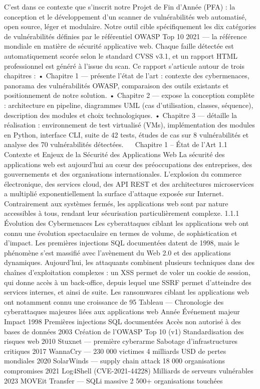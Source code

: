 C'est dans ce contexte que s'inscrit notre Projet de Fin d'Année (PFA) : la conception et le développement d'un scanner de vulnérabilités web automatisé, open source, léger et modulaire. Notre outil cible spécifiquement les dix catégories de vulnérabilités définies par le référentiel OWASP Top 10 2021 — la référence mondiale en matière de sécurité applicative web. Chaque faille détectée est automatiquement scorée selon le standard CVSS v3.1, et un rapport HTML professionnel est généré à l'issue du scan.
Ce rapport s'articule autour de trois chapitres :
•	Chapitre 1 — présente l'état de l'art : contexte des cybermenaces, panorama des vulnérabilités OWASP, comparaison des outils existants et positionnement de notre solution.
•	Chapitre 2 — expose la conception complète : architecture en pipeline, diagrammes UML (cas d'utilisation, classes, séquence), description des modules et choix technologiques.
•	Chapitre 3 — détaille la réalisation : environnement de test virtualisé (VMs), implémentation des modules en Python, interface CLI, suite de 42 tests, études de cas sur 8 vulnérabilités et analyse des 70 vulnérabilités détectées.
 
Chapitre 1 – État de l'Art
1.1  Contexte et Enjeux de la Sécurité des Applications Web
La sécurité des applications web est aujourd'hui au cœur des préoccupations des entreprises, des gouvernements et des organisations internationales. L'explosion du commerce électronique, des services cloud, des API REST et des architectures microservices a multiplié exponentiellement la surface d'attaque exposée sur Internet. Contrairement aux systèmes fermés, les applications web sont par nature accessibles à tous, rendant leur sécurisation particulièrement complexe.
1.1.1  Évolution des Cybermenaces
Les cyberattaques ciblant les applications web ont connu une évolution spectaculaire en termes de volume, de sophistication et d'impact. Les premières injections SQL documentées datent de 1998, mais le phénomène s'est massifié avec l'avènement du Web 2.0 et des applications dynamiques. Aujourd'hui, les attaquants combinent plusieurs techniques dans des chaînes d'exploitation complexes : un XSS permet de voler un cookie de session, qui donne accès à un back-office, depuis lequel une SSRF permet d'atteindre des services internes, et ainsi de suite.
Les ransomwares ciblant les applications web ont notamment connu une croissance de 95 %
Tableau — Chronologie des cyberattaques majeures liées aux applications web
Année	Événement majeur	Impact
1998	Premières injections SQL documentées	Accès non autorisé à des bases de données
2003	Création de l'OWASP Top 10 (v1)	Standardisation des risques web
2010	Stuxnet — première cyberarme	Sabotage d'infrastructures critiques
2017	WannaCry — 230 000 victimes	4 milliards USD de pertes mondiales
2020	SolarWinds — supply chain attack	18 000 organisations compromises
2021	Log4Shell (CVE-2021-44228)	Milliards de serveurs vulnérables
2023	MOVEit Transfer — SQLi massive	2 500+ organisations touchées

